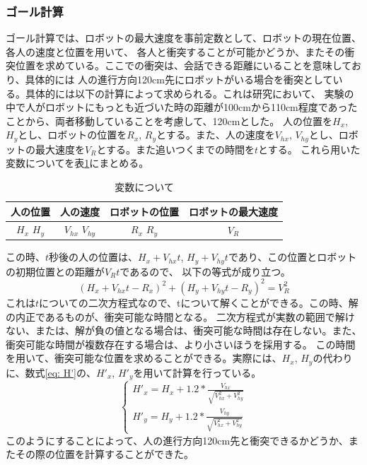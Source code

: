 \documentclass[11pt,a4j]{jreport}
\begin{document}
\subsubsection{ゴール計算}
ゴール計算では、ロボットの最大速度を事前定数として、ロボットの現在位置、各人の速度と位置を用いて、
各人と衝突することが可能かどうか、またその衝突位置を求めている。ここでの衝突は、会話できる距離にいることを意味しており、具体的には
人の進行方向120cm先にロボットがいる場合を衝突としている。具体的には以下の計算によって求められる。これは研究\cite{mumm2011human}において、
実験の中で人がロボットにもっとも近づいた時の距離が100cmから110cm程度であったことから、両者移動していることを考慮して、120cmとした。
人の位置を$H_x$, $H_y$とし、ロボットの位置を$R_x$, $R_y$とする。また、人の速度を$V_{hx}$, $V_{hy}$とし、ロボットの最大速度を$V_R$とする。また追いつくまでの時間を$t$とする。
これら用いた変数についてを表\ref{fig: variable}にまとめる。
\begin{table}[H]
  \centering
  \begin{tabular}{|c|c|c|c|}
    \hline
    人の位置 & 人の速度 & ロボットの位置 & ロボットの最大速度 \\ \hline
    $H_x$  $H_y$ & $V_{hx}$  $V_{hy}$ & $R_x$  $R_y$ & $V_R$ \\ \hline
  \end{tabular}
  \caption{変数について}
  \label{fig: variable}
\end{table}
この時、$t$秒後の人の位置は、$H_x + V_{hx}t$, $H_y + V_{hy}t$であり、この位置とロボットの初期位置との距離が$V_Rt$であるので、
以下の等式が成り立つ。\begin{equation}(H_x + V_{hx}t - R_x)^{2} + (H_y + V_{hy}t - R_y)^2 = V_R^2\end{equation}
これは$t$についての二次方程式なので、tについて解くことができる。この時、解の内正であるものが、衝突可能な時間となる。
二次方程式が実数の範囲で解けない、または、解が負の値となる場合は、衝突可能な時間は存在しない。また、衝突可能な時間が複数存在する場合は、より小さいほうを採用する。
この時間を用いて、衝突可能な位置を求めることができる。実際には、$H_x$, $H_y$の代わりに、数式\ref{eq: H'}の、$H'_x$, $H'_y$を用いて計算を行っている。
\begin{equation}
  \label{eq: H'}
\left\{\begin{array}{l}
H'_x = H_x + 1.2*\frac{V_{hx}}{\sqrt{{V_{hx}^2 + V_{hy}^2}}}\\
H'_y = H_y + 1.2 * \frac{V_{hy}}{\sqrt{V_{hx}^2 + V_{hy}^2}}
\end{array}\right.
\end{equation}
このようにすることによって、人の進行方向120cm先と衝突できるかどうか、またその際の位置を計算することができた。
\end{document}
